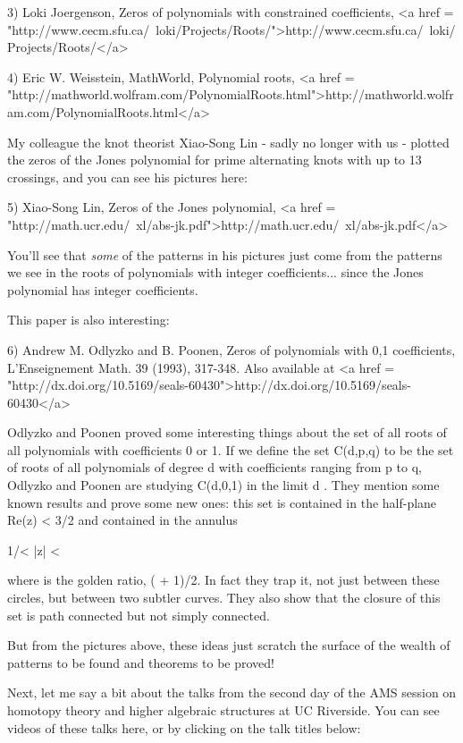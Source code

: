 3) Loki Joergenson, Zeros of polynomials with constrained coefficients,
<a href = "http://www.cecm.sfu.ca/~loki/Projects/Roots/">http://www.cecm.sfu.ca/~loki/Projects/Roots/</a>

4) Eric W. Weisstein, MathWorld, Polynomial roots, 
<a href = "http://mathworld.wolfram.com/PolynomialRoots.html">http://mathworld.wolfram.com/PolynomialRoots.html</a>

My colleague the knot theorist Xiao-Song Lin - sadly no longer with us
- plotted the zeros of the Jones polynomial for prime alternating
knots with up to 13 crossings, and you can see his pictures here:

5) Xiao-Song Lin, Zeros of the Jones polynomial,
<a href = "http://math.ucr.edu/~xl/abs-jk.pdf">http://math.ucr.edu/~xl/abs-jk.pdf</a>

You'll see that \emph{some} of the patterns in his pictures just come from
the patterns we see in the roots of polynomials with integer
coefficients... since the Jones polynomial has integer coefficients.

This paper is also interesting:

6) Andrew M. Odlyzko and B. Poonen, Zeros of polynomials with 0,1
coefficients, L'Enseignement Math. 39 (1993), 317-348. Also available
at <a href = "http://dx.doi.org/10.5169/seals-60430">http://dx.doi.org/10.5169/seals-60430</a>

Odlyzko and Poonen proved some interesting things about the set of all
roots of all polynomials with coefficients 0 or 1.  If we define the
set C(d,p,q) to be the set of roots of all polynomials of degree d 
with coefficients ranging from p to q, Odlyzko and Poonen are 
studying C(d,0,1) in the limit d \to  \infty .  They mention some 
known results and prove some new ones: this set is contained in 
the half-plane Re(z) < 3/2 and contained in the annulus 

1/\Phi  < |z| < \Phi 

where \Phi  is the golden ratio, ( + 1)/2.  In fact they trap it,
not just between these circles, but between two subtler curves.  They
also show that the closure of this set is path connected but not
simply connected.

But from the pictures above, these ideas just scratch the surface
of the wealth of patterns to be found and theorems to be proved!

Next, let me say a bit about the talks from the second day of the 
AMS session on homotopy theory and higher algebraic structures at 
UC Riverside.  You can see videos of these talks here, or by clicking
on the talk titles below:

